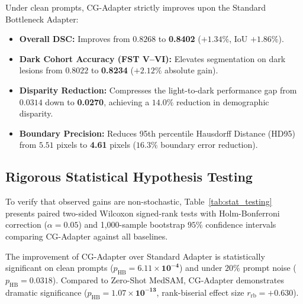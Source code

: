 \documentclass[runningheads]{llncs}
\begin{document}
Under clean prompts, CG-Adapter strictly improves upon the Standard Bottleneck Adapter:
\begin{itemize}
    \item \textbf{Overall DSC:} Improves from $0.8268$ to \textbf{0.8402} ($+1.34\%$, IoU $+1.86\%$).
    \item \textbf{Dark Cohort Accuracy (FST V--VI):} Elevates segmentation on dark lesions from $0.8022$ to \textbf{0.8234} ($+2.12\%$ absolute gain).
    \item \textbf{Disparity Reduction:} Compresses the light-to-dark performance gap from $0.0314$ down to \textbf{0.0270}, achieving a $14.0\%$ reduction in demographic disparity.
    \item \textbf{Boundary Precision:} Reduces 95th percentile Hausdorff Distance (HD95) from $5.51$ pixels to \textbf{4.61} pixels ($16.3\%$ boundary error reduction).
\end{itemize}

\subsection{Rigorous Statistical Hypothesis Testing}
To verify that observed gains are non-stochastic, Table~\ref{tab:stat_testing} presents paired two-sided Wilcoxon signed-rank tests with Holm-Bonferroni correction ($\alpha=0.05$) and 1,000-sample bootstrap $95\%$ confidence intervals comparing CG-Adapter against all baselines.

The improvement of CG-Adapter over Standard Adapter is statistically significant on clean prompts ($p_{\text{HB}} = \mathbf{6.11 \times 10^{-4}}$) and under $20\%$ prompt noise ($p_{\text{HB}} = \mathbf{0.0318}$). Compared to Zero-Shot MedSAM, CG-Adapter demonstrates dramatic significance ($p_{\text{HB}} = \mathbf{1.07 \times 10^{-13}}$, rank-biserial effect size $r_{\text{rb}} = +0.630$).
\end{document}
